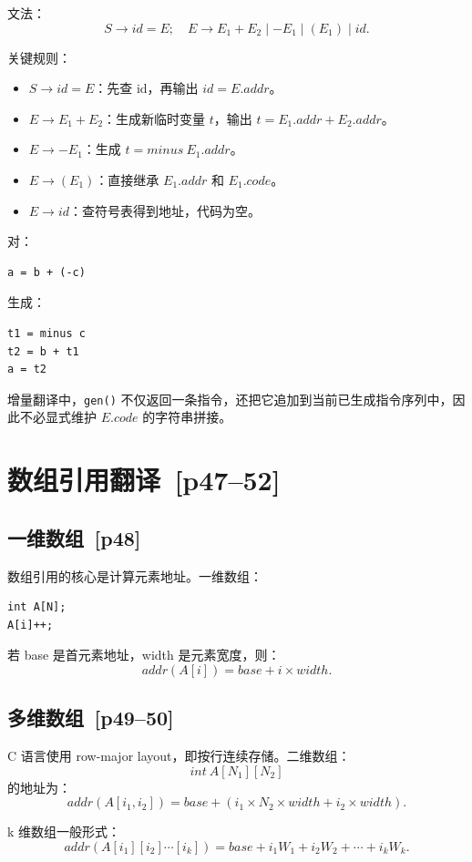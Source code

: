 \documentclass[UTF8,fontset=none,11pt]{ctexart}
\newcommand{\pg}[1]{\texorpdfstring{{\small\color{graytext}\,[p#1]}}{ [p#1]}}
\begin{document}
文法：
\[
S\to id=E;\quad
E\to E_1+E_2\mid -E_1\mid (E_1)\mid id.
\]

关键规则：

\begin{itemize}
  \item \(S\to id=E\)：先查 id，再输出 \(id=E.addr\)。
  \item \(E\to E_1+E_2\)：生成新临时变量 \(t\)，输出 \(t=E_1.addr+E_2.addr\)。
  \item \(E\to -E_1\)：生成 \(t=minus\ E_1.addr\)。
  \item \(E\to (E_1)\)：直接继承 \(E_1.addr\) 和 \(E_1.code\)。
  \item \(E\to id\)：查符号表得到地址，代码为空。
\end{itemize}

对：
\begin{verbatim}
a = b + (-c)
\end{verbatim}
生成：
\begin{verbatim}
t1 = minus c
t2 = b + t1
a = t2
\end{verbatim}

增量翻译中，\texttt{gen()} 不仅返回一条指令，还把它追加到当前已生成指令序列中，因此不必显式维护 \(E.code\) 的字符串拼接。

\section{数组引用翻译 \pg{47--52}}

\subsection{一维数组 \pg{48}}

数组引用的核心是计算元素地址。一维数组：
\begin{verbatim}
int A[N];
A[i]++;
\end{verbatim}

若 base 是首元素地址，width 是元素宽度，则：
\[
addr(A[i]) = base + i \times width.
\]

\subsection{多维数组 \pg{49--50}}

C 语言使用 row-major layout，即按行连续存储。二维数组：
\[
int\ A[N_1][N_2]
\]
的地址为：
\[
addr(A[i_1,i_2]) = base + (i_1\times N_2\times width+i_2\times width).
\]

k 维数组一般形式：
\[
addr(A[i_1][i_2]\cdots[i_k])=base+i_1W_1+i_2W_2+\cdots+i_kW_k.
\]
\end{document}
